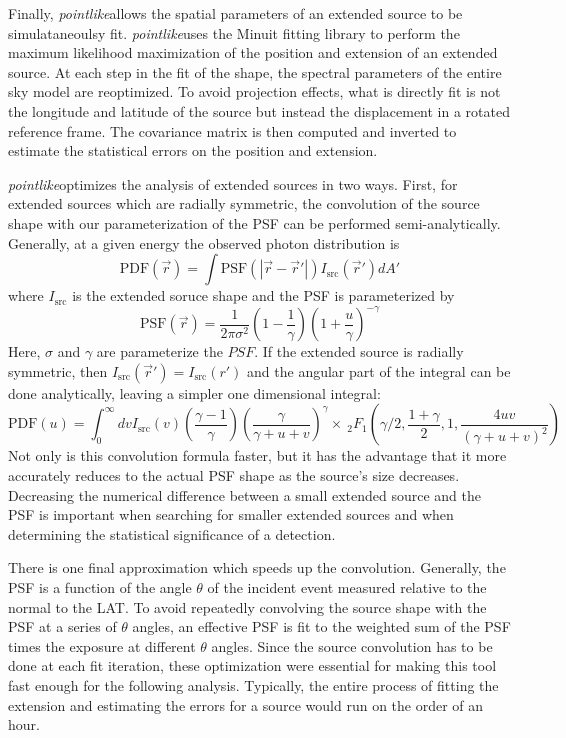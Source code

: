 \documentclass[preprint]{aastex}
\newcommand{\pointlike}{{\em pointlike}}
\begin{document}
Finally, \pointlike allows the spatial parameters of an extended
source to be simulataneoulsy fit. \pointlike uses the Minuit fitting
library to perform the maximum likelihood maximization of the position
and extension of an extended source\cite{Minuit reference}.  At each
step in the fit of the shape, the spectral parameters of the entire sky
model are reoptimized. To avoid projection effects, what is directly
fit is not the longitude and latitude of the source but instead
the displacement in a rotated reference frame. The covariance matrix is
then computed and inverted to estimate the statistical errors on the
position and extension.

\pointlike optimizes the analysis of extended sources in two ways.
First, for extended sources which are radially symmetric, the convolution
of the source shape with our parameterization of the PSF can be performed
semi-analytically. Generally, at a given energy the observed 
photon distribution is
\begin{equation}
  \text{PDF}(\vec r) = \int  \text{PSF}(|\vec r - \vec r'|)I_\text{src}(\vec r') d A' 
\end{equation}
where $I_\text{src}$ is the extended soruce shape and the PSF is parameterized by
\begin{equation}
  \text{PSF}(\vec r) = 
  \frac{1}{2\pi\sigma^2}
  \left(1-\frac{1}{\gamma}\right)
  \left(1+\frac{u}{\gamma}\right)^{-\gamma}
\end{equation}
Here, $\sigma$ and $\gamma$ are parameterize the $PSF$.
If the extended source is radially symmetric, then
$I_\text{src} (\vec r') = I_\text{src} (r')$ and the angular part of the
integral can be done analytically, leaving a simpler one dimensional
integral:
\begin{equation}
  \text{PDF}(u)= \int_0^\infty dv
  I_\text{src}(v) 
  \left(\frac{\gamma-1}{\gamma}\right)
  \left( \frac{\gamma}{\gamma + u + v}\right)^\gamma 
  \times ~_2F_1 \left(\gamma/2,\frac{1+\gamma}{2},1,\frac{4uv}{(\gamma+u+v)^2}\right)
\end{equation}
Not only is this convolution formula faster, but it has the advantage
that it more accurately reduces to the actual PSF shape as the source's
size decreases.  Decreasing the numerical difference between a small extended
source and the PSF is important when searching for smaller extended sources
and when determining the statistical significance of a detection.

There is one final approximation which speeds up the convolution.
Generally, the PSF is a function of the angle $\theta$ of the incident
event measured relative to the normal to the LAT. To avoid repeatedly
convolving the source shape with the PSF at a series of $\theta$ angles,
an effective PSF is fit to the weighted sum of the PSF times the exposure
at different $\theta$ angles.  Since the source convolution has to be
done at each fit iteration, these optimization were essential for making
this tool fast enough for the following analysis. Typically, the entire
process of fitting the extension and estimating the errors for a source
would run on the order of an hour.
\end{document}
